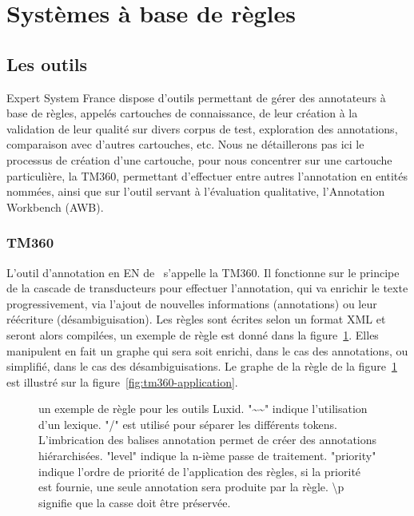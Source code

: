\documentclass[12pt,a4paper,times,twoside,openright]{report}
\begin{document}
    
    \section{Systèmes à base de règles}
    \label{sec:rule-based-systems}
    
        \subsection{Les outils \Luxid}
        \label{subsec:Luxid}
Expert System France dispose d'outils permettant de gérer des annotateurs à base de règles, appelés cartouches de connaissance, de leur création à la validation de leur qualité sur divers corpus de test, exploration des annotations, comparaison avec d'autres cartouches, etc. Nous ne détaillerons pas ici le processus de création d'une cartouche, pour nous concentrer sur une cartouche particulière, la TM360, permettant d'effectuer entre autres l'annotation en entités nommées, ainsi que sur l'outil servant à l'évaluation qualitative, l'Annotation Workbench (AWB).


            \subsubsection{TM360}
            \label{subsubsec:TM360}
L'outil d'annotation en EN de \Luxid\ s'appelle la TM360. Il fonctionne sur le principe de la cascade de transducteurs pour effectuer l'annotation, qui va enrichir le texte progressivement, via l'ajout de nouvelles informations (annotations) ou leur réécriture (désambiguisation). Les règles sont écrites selon un format XML et seront alors compilées, un exemple de règle est donné dans la figure\ \ref{fig:tm360-rule}. Elles manipulent en fait un graphe qui sera soit enrichi, dans le cas des annotations, ou simplifié, dans le cas des désambiguisations. Le graphe de la règle de la figure\ \ref{fig:tm360-rule} est illustré sur la figure\ \ref{fig:tm360-application}.

\begin{figure}[ht!]
\begin{xml}
\end{xml}
\caption{un exemple de règle pour les outils Luxid. "\~{}\~{}" indique l'utilisation d'un lexique. "/" est utilisé pour séparer les différents tokens. L'imbrication des balises annotation permet de créer des annotations hiérarchisées. "level" indique la n-ième passe de traitement. "priority" indique l'ordre de priorité de l'application des règles, si la priorité est fournie, une seule annotation sera produite par la règle. \textbackslash{}p signifie que la casse doit être préservée.}
\label{fig:tm360-rule}
\end{figure}
\end{document}
